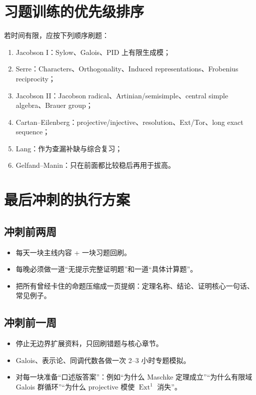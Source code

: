 \documentclass[12pt,a4paper]{ctexart}
\begin{document}
\section{习题训练的优先级排序}

若时间有限，应按下列顺序刷题：
\begin{enumerate}
  \item Jacobson I：Sylow、Galois、PID 上有限生成模；
  \item Serre：Characters、Orthogonality、Induced representations、Frobenius reciprocity；
  \item Jacobson II：Jacobson radical、Artinian/semisimple、central simple algebra、Brauer group；
  \item Cartan--Eilenberg：projective/injective、resolution、Ext/Tor、long exact sequence；
  \item Lang：作为查漏补缺与综合复习；
  \item Gelfand--Manin：只在前面都比较稳后再用于拔高。
\end{enumerate}

\section{最后冲刺的执行方案}

\subsection{冲刺前两周}

\begin{itemize}
  \item 每天一块主线内容 + 一块习题回刷。
  \item 每晚必须做一道“无提示完整证明题”和一道“具体计算题”。
  \item 把所有曾经卡住的命题压缩成一页提纲：定理名称、结论、证明核心一句话、常见例子。
\end{itemize}

\subsection{冲刺前一周}

\begin{itemize}
  \item 停止无边界扩展资料，只回刷错题与核心章节。
  \item Galois、表示论、同调代数各做一次 2--3 小时专题模拟。
  \item 对每一块准备“口述版答案”：例如“为什么 Maschke 定理成立”“为什么有限域 Galois 群循环”“为什么 projective 模使 \( \operatorname{Ext}^1 \) 消失”。
\end{itemize}
\end{document}
